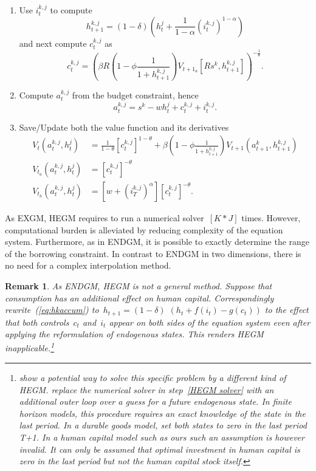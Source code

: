 \documentclass[a4paper,12pt]{article}
\newtheorem{remark}[theorem]{Remark}
\begin{document}
\begin{enumerate}
\begin{enumerate}
		\item Use $i_{t}^{k,j}$ to compute
		\[
		h_{t+1}^{k,j}=\left(1 - \delta\right) \left(h_{t}^{j} + \frac{1} {1 - \alpha}\left(i_{t}^{k,j}\right)^{1-\alpha}\right)
		\]
		and next compute $c_{t}^{k,j}$ as
		\[
		c_{t}^{k,j} = \left(\beta R \left(1 - \phi \frac{1} {1 + h_{t+1}^{k,j}}\right) \text{$V_{t+1_{a}}$}\left[R s^{k},h_{t+1}^{k,j}\right]\right)^{-\frac{1}{\theta}}.
		\]
		 
		\item Compute $a_{t}^{k,j}$ from the budget constraint, hence
		\[
		a_{t}^{k,j}=s^{k} - w h_{t}^{j} + c_{t}^{k,j} + i_{t}^{k,j}.
		\]

		\item Save/Update both the value function and its derivatives
		\begin{align*}
		V_{t}\left(a_{t}^{k,j},h_{t}^{j}\right)  &  = \frac{1} {1 - \theta}\left[c_{t}^{k,j}\right]^{1 - \theta} + \beta \left(1 - \phi \frac{1} {1 + h_{t+1}^{k,j}}\right) V_{t+1}(a_{t+1}^{k},h_{t+1}^{k,j})  \\
		\text{$V_{t_{a}}$}\left(a_{t}^{k,j},h_{t}^{j}\right)  &  =\left[c_{t}^{k,j}\right]^{-\theta}  \\
		\text{$V_{t_{h}}$}\left(a_{t}^{k,j},h_{t}^{j}\right)  &  =\left[w + \left(i_{T}^{k,j}\right)^{\alpha}\right] \left[c_{t}^{k,j}\right]^{-\theta}.
		\end{align*}

	\end{enumerate}
\end{enumerate}

As EXGM, HEGM requires to run a numerical solver~$\left[ K \ast J\right]$ times. However, computational burden is alleviated by reducing complexity of the equation system. Furthermore, as in ENDGM, it is possible to exactly determine the range of the borrowing constraint. In contrast to ENDGM in two dimensions, there is no need for a complex interpolation method.

\begin{remark} 	
	\label{rem:failurehegm}
	As ENDGM, HEGM is not a general method. Suppose that consumption has an additional effect on human capital. Correspondingly rewrite~(\ref{eq:hkaccum}) to~$h_{t+1}=\left(1 - \delta\right)$ $\left(h_{t} + f(i_{t}) - g\left(c_{t}\right) \right)$ to the effect that both controls~$c_{t}$ and~$i_{t}$ appear on both sides of the equation system even after applying the reformulation of endogenous states. This renders HEGM inapplicable.\footnote{ show a potential way to solve this specific problem by a different kind of HEGM.  replace the numerical solver in step~\ref{HEGM solver} with an additional outer loop over a guess for a future endogenous state. In finite horizon models, this procedure requires an exact knowledge of the state in the last period. In a durable goods model,  set both states to zero in the last period T+1. In a human capital model such as ours such an assumption is however invalid. It can only be assumed that optimal investment in human capital is zero in the last period but not the human capital stock itself.}
\end{remark}
\end{document}
